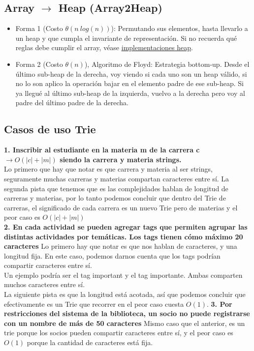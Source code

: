 \documentclass[10pt,a4paper]{article}
\begin{document}
\subsection*{Array $\rightarrow$ Heap (Array2Heap)}
\label{subsec:array_2_heap}
\begin{itemize}
    \item Forma 1 (Costo $\theta(n \ log(n))$): Permutando sus elementos, hasta llevarlo a un heap y que cumpla el invariante de representación. Si no recuerda qué reglas debe cumplir el array, véase \hyperref[subsec:implementaciones_heap]{\underline{implementaciones heap}}.
    \item Forma 2 (Costo $\theta(n)$), Algoritmo de Floyd: Estrategia bottom-up. Desde el último sub-heap de la derecha, voy viendo si cada uno son un heap válido, si no lo son aplico la operación bajar en el elemento padre de ese sub-heap. Si ya llegué al último sub-heap de la izquierda, vuelvo a la derecha pero voy al padre del último padre de la derecha.
\end{itemize}
\subsection*{Casos de uso Trie}
\label{subsec:operaciones_trie}
\textbf{1. Inscribir al estudiante en la materia m de la carrera c $\rightarrow O(|c| + |m|)$ siendo la carrera y materia strings.} \\
Lo primero que hay que notar es que carrera y materia al ser strings, seguramente muchas carreras y materias compartan caracteres entre sí. La segunda pista que tenemos que es las complejidades hablan de longitud de carreras y materias, por lo tanto podemos concluir que dentro del Trie de carreras, el significado de cada carrera es un nuevo Trie pero de materias y el peor caso es $O(|c| + |m|)$\\
\textbf{2. En cada actividad se pueden agregar tags que permiten agrupar las distintas actividades por temáticas. Los tags tienen cómo máximo 20 caracteres}
Lo primero hay que notar es que nos hablan de caracteres, y una longitud fija. En este caso, podemos darnos cuenta que los tags podrían compartir caracteres entre sí. \\
Un ejemplo podría ser el tag important y el tag importante. Ambas comparten muchos caracteres entre sí. \\
La siguiente pista es que la longitud está acotada, así que podemos concluir que efectivamente es un Trie que recorrer en el peor caso cuesta $O(1)$.
\textbf{3. Por restricciones del sistema de la biblioteca, un socio no puede registrarse con un nombre de más de 50 caracteres}
Mismo caso que el anterior, es un trie porque los socios pueden compartir caracteres entre sí, y el peor caso es $O(1)$ porque la cantidad de caracteres está fija.
\end{document}
